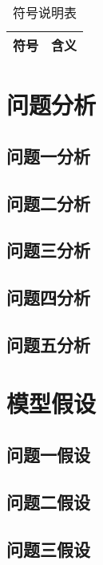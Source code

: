 \documentclass{article}
\begin{document}
\begin{table}[H]
\centering
\caption{符号说明表}
\begin{tabular}{|c|l|}
\hline
符号 & 含义 \\
\hline

\hline
\end{tabular}
\end{table}

\section{问题分析}

\subsection{问题一分析}

\subsection{问题二分析}

\subsection{问题三分析}

\subsection{问题四分析}

\subsection{问题五分析}

\section{模型假设}

\subsection{问题一假设}

\subsection{问题二假设}

\subsection{问题三假设}
\end{document}
